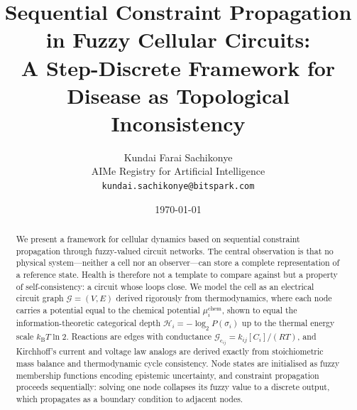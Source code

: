 \documentclass[10pt,twocolumn,a4paper]{article}
\theoremstyle{plain}
\theoremstyle{definition}
\theoremstyle{remark}
\newcommand{\kB}{k_{\mathrm{B}}}
\newcommand{\circuit}{\mathcal{G}}
\newcommand{\Hcat}{\mathcal{H}}
\newcommand{\Gcond}{\mathcal{G}_{\mathrm{c}}}
\begin{document}
\title{\textbf{Sequential Constraint Propagation in Fuzzy Cellular Circuits:\\[0.5em]
\large A Step-Discrete Framework for Disease as Topological Inconsistency}}

\author{
Kundai Farai Sachikonye\\
AIMe Registry for Artificial Intelligence\\
\texttt{kundai.sachikonye@bitspark.com}
}

\date{\today}

\maketitle

\begin{abstract}
\noindent We present a framework for cellular dynamics based on sequential constraint propagation through fuzzy-valued circuit networks. The central observation is that no physical system---neither a cell nor an observer---can store a complete representation of a reference state. Health is therefore not a template to compare against but a property of self-consistency: a circuit whose loops close. We model the cell as an electrical circuit graph $\circuit = (V, E)$ derived rigorously from thermodynamics, where each node carries a potential equal to the chemical potential $\mu_i^{\mathrm{chem}}$, shown to equal the information-theoretic categorical depth $\Hcat_i = -\log_2 P(\sigma_i)$ up to the thermal energy scale $\kB T \ln 2$. Reactions are edges with conductance $\Gcond_{ij} = k_{ij}[C_i]/(RT)$, and Kirchhoff's current and voltage law analogs are derived exactly from stoichiometric mass balance and thermodynamic cycle consistency. Node states are initialised as fuzzy membership functions encoding epistemic uncertainty, and constraint propagation proceeds sequentially: solving one node collapses its fuzzy value to a discrete output, which propagates as a boundary condition to adjacent nodes.


\end{abstract}
\end{document}
